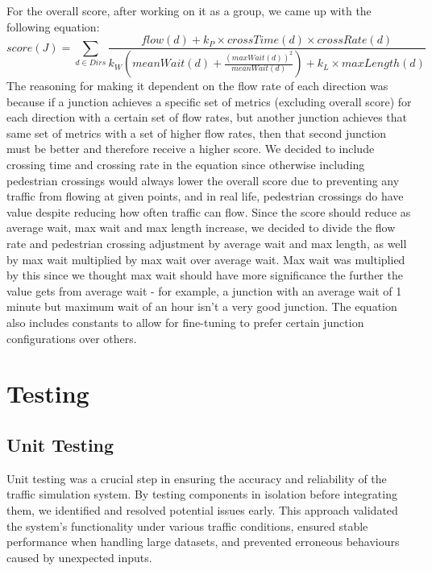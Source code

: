 \documentclass{article}
\begin{document}
    For the overall score, after working on it as a group, we came up with the following equation:
    $$score(J) = \sum_{d \in Dirs}\frac{flow(d) + k_P\times crossTime(d) \times crossRate(d)}{k_W (meanWait(d)+\frac{(maxWait(d))^2}{meanWait(d)}) + k_L\times maxLength(d)}$$
    The reasoning for making it dependent on the flow rate of each direction was because if a junction achieves a specific set of metrics (excluding overall score) for each direction with a certain set of flow rates, but another junction achieves that same set of metrics with a set of higher flow rates, then that second junction must be better and therefore receive a higher score. We decided to include crossing time and crossing rate in the equation since otherwise including pedestrian crossings would always lower the overall score due to preventing any traffic from flowing at given points, and in real life, pedestrian crossings do have value despite reducing how often traffic can flow. Since the score should reduce as average wait, max wait and max length increase, we decided to divide the flow rate and pedestrian crossing adjustment by average wait and max length, as well by max wait multiplied by max wait over average wait. Max wait was multiplied by this since we thought max wait should have more significance the further the value gets from average wait - for example, a junction with an average wait of 1 minute but maximum wait of an hour isn’t a very good junction. The equation also includes constants to allow for fine-tuning to prefer certain junction configurations over others.


    \section{Testing}

    \subsection{Unit Testing}
    Unit testing was a crucial step in ensuring the accuracy and reliability of the traffic simulation system. By testing components in isolation before integrating them, we identified and resolved potential issues early. This approach validated the system’s functionality under various traffic conditions, ensured stable performance when handling large datasets, and prevented erroneous behaviours caused by unexpected inputs.
\end{document}
